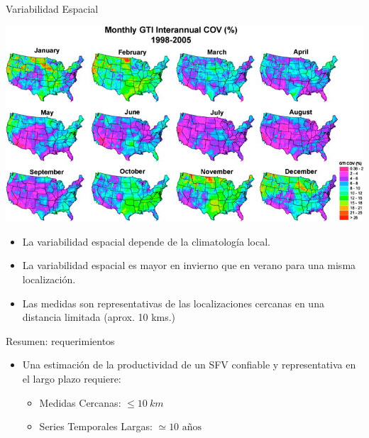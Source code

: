 \documentclass[xcolor={usenames,svgnames,dvipsnames}]{beamer}
\begin{document}
\begin{frame}[label={sec:org88da936}]{Variabilidad Espacial}
\begin{center}
\includegraphics[height=0.4\textheight]{../figs/SpatialVariability.jpg}
\end{center}

\begin{itemize}
\item La variabilidad espacial depende de la \alert{climatología local}.
\item La variabilidad espacial es \alert{mayor en invierno que en verano} para una misma localización.
\item Las medidas son representativas de las localizaciones cercanas en una distancia limitada (aprox. 10 kms.)
\end{itemize}
\end{frame}

\begin{frame}[label={sec:orgb10e792}]{Resumen: requerimientos}
\begin{itemize}
\item Una estimación de la productividad de un SFV confiable y representativa en el largo plazo requiere:
\begin{itemize}
\item \alert{Medidas Cercanas}: \(\leq \SI{10}{km}\)
\item \alert{Series Temporales Largas}: \(\simeq 10 \text{ años}\)
\end{itemize}
\end{itemize}
\end{frame}
\end{document}
